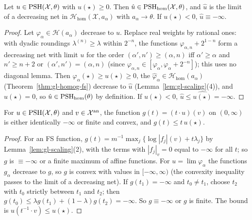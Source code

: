 \begin{corollary}\label{cor:gl-pshhom}
\leanok
{}
Let $u\in\operatorname{PSH}(\mathcal X,\theta)$ with $u(\star)\ge0$. Then $\hat u\in\operatorname{PSH}_{\mathrm{hom}}(\mathcal X,\theta)$, and $\hat u$ is the limit of a decreasing net in
$\mathcal H_{\mathrm{hom}}(\mathcal X,a_\alpha)$ with $a_\alpha\to\theta$. If $u(\star)<0$, $\hat u\equiv-\infty$.
\end{corollary}

\begin{proof}
Let $\varphi_\alpha\in\mathcal H(a_\alpha)$ decrease to $u$. Replace real weights by rational ones: with dyadic roundings $\lambda^{(n)}\ge\lambda$ within $2^{-n}$,
the functions $\varphi_{\alpha,n}+2^{1-n}$ form a decreasing net with limit $u$ for the order $(\alpha',n')\ge(\alpha,n)$ iff $\alpha'\ge\alpha$ and $n'\ge n+2$ or
$(\alpha',n')=(\alpha,n)$ (since $\varphi_{\alpha,n}\in[\varphi_\alpha,\varphi_\alpha+2^{-n}]$); this uses no diagonal lemma. Then $\varphi_\alpha(\star)\ge u(\star)\ge0$, the
$\hat\varphi_\alpha\in\mathcal H_{\mathrm{hom}}(a_\alpha)$ (Theorem~\ref{thm:gl-homog-fs}) decrease to $\hat u$ (Lemma~\ref{lem:gl-scaling}(4)), and
$\hat u(\star)=0$, so $\hat u\in\operatorname{PSH}_{\mathrm{hom}}(\theta)$ by definition. If $u(\star)<0$, $\hat u\le\widehat{u(\star)}=-\infty$.
\end{proof}

\begin{lemma}\label{lem:gl-action-convex}
\leanok
{}
For $u\in\operatorname{PSH}(\mathcal X,\theta)$ and $v\in\mathcal X^{\mathrm{an}}$, the function $g(t)=(t\cdot u)(v)$ on $(0,\infty)$ is either identically $-\infty$ or finite and
convex, and $g(t)\le t\,u(\star)$.
\end{lemma}

\begin{proof}
For an FS function, $g(t)=m^{-1}\max_j\{\log|f_j|(v)+t\lambda_j\}$ by Lemma~\ref{lem:gl-scaling}(2), with the terms with $|f_j|_v=0$ equal to
$-\infty$ for all $t$; so $g$ is $\equiv-\infty$ or a finite maximum of affine functions. For $u=\lim\varphi_\alpha$ the functions $g_\alpha$ decrease to $g$, so $g$ is
convex with values in $[-\infty,\infty)$ (the convexity inequality passes to the limit of a decreasing net). If $g(t_1)=-\infty$ and $t_0\ne t_1$, choose $t_2$ with $t_0$
strictly between $t_1$ and $t_2$; then $g(t_0)\le\lambda g(t_1)+(1-\lambda)g(t_2)=-\infty$. So $g\equiv-\infty$ or $g$ is finite. The bound is
$u(t^{-1}\cdot v)\le u(\star)$.
\end{proof}

